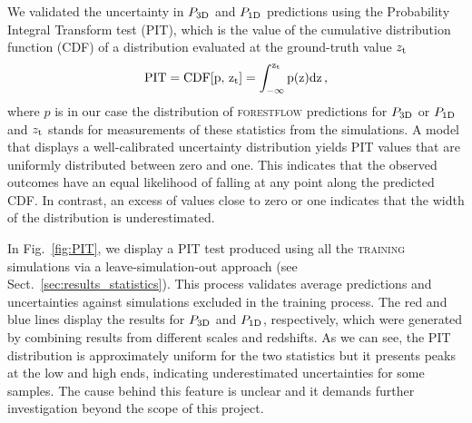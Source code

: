 \documentclass[longauth]{aa}
\newcommand{\poned}{\ensuremath{P_{\rm 1D}}\xspace}
\newcommand{\pthreed}{\ensuremath{P_{\rm 3D}}\xspace}
\newcommand{\forestflow}{\textsc{forestflow}\xspace}
\newcommand{\lacehc}{\textsc{training}\xspace}
\begin{document}
\begin{appendix}
We validated the uncertainty in \pthreed and \poned predictions using the Probability Integral Transform test (PIT), which is the value of the cumulative distribution function (CDF) of a distribution evaluated at the ground-truth value $z_{\rm t}$
%
\begin{equation}
    \rm{PIT} = \mathrm{CDF}[p,\,z_{\rm t}]=\int_{-\infty}^{z_{\rm t}} p(z) \mathrm{d}z\, ,
    \label{eq:pit} 
\end{equation} 
%
where $p$ is in our case the distribution of \forestflow predictions for \pthreed or \poned and $z_{\rm t}$ stands for measurements of these statistics from the simulations. A model that displays a well-calibrated uncertainty distribution yields PIT values that are uniformly distributed between zero and one. This indicates that the observed outcomes have an equal likelihood of falling at any point along the predicted CDF. In contrast, an excess of values close to zero or one indicates that the width of the distribution is underestimated.

In Fig.~\ref{fig:PIT}, we display a PIT test produced using all the \lacehc simulations via a leave-simulation-out approach (see Sect.~\ref{sec:results_statistics}). This process validates average predictions and uncertainties against simulations excluded in the training process. The red and blue lines display the results for \pthreed and \poned, respectively, which were generated by combining results from different scales and redshifts. As we can see, the PIT distribution is approximately uniform for the two statistics but it presents peaks at the low and high ends, indicating underestimated uncertainties for some samples. The cause behind this feature is unclear and it demands further investigation beyond the scope of this project.

\end{appendix}
\end{document}
